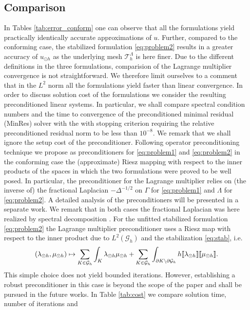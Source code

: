 \documentclass[r]{siamart171218}
\begin{document}
\subsection{Comparison}
In Tables \ref{tab:error_conform} one can observe that 
all the formulations yield practically identically accurate approximations of $u$.
Further, compared to the conforming case, the stabilized formulation \eqref{eq:problem2}
results in a greater accuracy of $u_{\odot h}$ as the underlying mesh $\mathcal{T}^{\Lambda}_{h}$ is
here finer. Due to the different definitions in the three formulations, comparision of the Lagrange
multiplier convergence is not straightforward. We therefore limit ourselves to a
comment that in the $L^2$ norm all the formulations yield faster than linear convergence.
%
In order to discuss solution cost of the formulations we consider 
the resulting preconditioned linear systems. In particular, we shall compare
spectral condition numbers and the time to convergence of the preconditioned
minimal residual (MinRes) solver with the with stopping criterion requiring
the relative preconditioned residual norm to be less than $10^{-8}$. We remark
that we shall ignore the setup cost of the preconditioner.
%
Following operator preconditioning technique \cite{mardal2011preconditioning} we
propose as preconditioners for \eqref{eq:problem1} and \eqref{eq:problem2} in the
conforming case the (approximate) Riesz mapping with respect to the inner products of
the spaces in which the two formulations were proved to be well posed.
In particular, the preconditioner for the Lagrange multiplier relies on
(the inverse of) the fractional Laplacian $-\Delta^{-1/2}$ on $\Gamma$ for
\eqref{eq:problem1} and $\Lambda$ for \eqref{eq:problem2}.
A detailed analysis of the preconditioners will be presented in a separate
work. We remark that in both cases the fractional Laplacian was here realized
by spectral decomposition \cite{kuchta2016preconditioners}.
%
For the unfitted stabilized formulation \eqref{eq:problem2} the Lagrange multiplier preconditioner
uses a Riesz map with respect to the inner product due to $L^2(\mathcal{G}_h)$ and
the stabilization \eqref{eq:stab}, i.e.
\[
(\lambda_{\odot h}, \mu_{\odot h}) \mapsto \sum _{K\in \mathcal{G}_h}\int_{K}\lambda_{\odot h} \mu_{\odot h} + \sum _{K\in \mathcal{G}_h} \int_{\partial K \setminus \partial \mathcal{G}_h} h \llbracket \lambda_{\odot h} \rrbracket \llbracket \mu_{\odot h} \rrbracket.
\]
This simple choice does not yield bounded
iterations. However, establishing a robust preconditioner in this case 
is beyond the scope of the paper and shall be pursued in the future works.
%
In Table \ref{tab:cost} we compare solution time, number of iterations and
\end{document}
